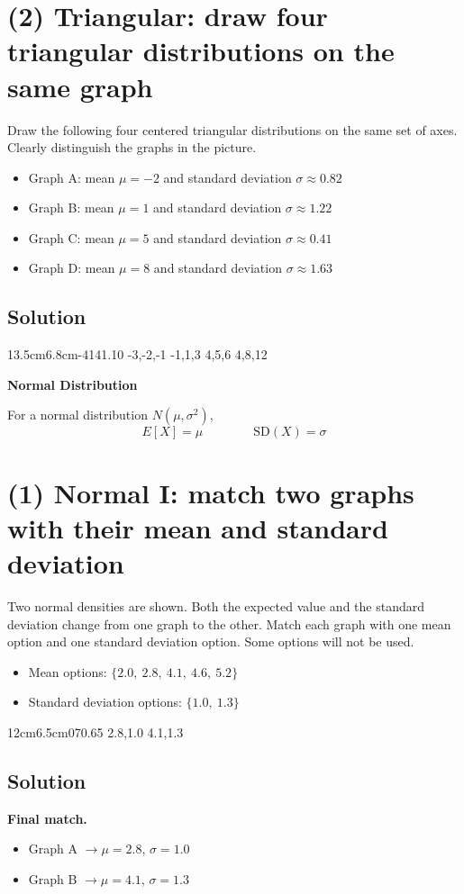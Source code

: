 \section{(2) Triangular: draw four triangular distributions on the same graph}
Draw the following four centered triangular distributions on the same set of axes. Clearly distinguish the graphs in the picture.
\begin{itemize}
\item Graph A: mean $\mu=-2$ and standard deviation $\sigma\approx0.82$
\item Graph B: mean $\mu=1$ and standard deviation $\sigma\approx1.22$
\item Graph C: mean $\mu=5$ and standard deviation $\sigma\approx0.41$
\item Graph D: mean $\mu=8$ and standard deviation $\sigma\approx1.63$
\end{itemize}
\subsection*{Solution}
\TriangularFourGraph
{13.5cm}{6.8cm}{-4}{14}{1.10}
{-3,-2,-1}
{-1,1,3}
{4,5,6}
{4,8,12}

\textbf{Normal Distribution}

For a normal distribution $N(\mu,\sigma^2)$,
\[
E[X]=\mu
\qquad \qquad
\mathrm{SD}(X)=\sigma
\]

\section{(1) Normal I: match two graphs with their mean and standard deviation}
Two normal densities are shown. Both the expected value and the standard deviation change from one graph to the other.
Match each graph with one mean option and one standard deviation option. Some options will not be used.
\begin{itemize}
\item Mean options: $\{2.0,\ 2.8,\ 4.1,\ 4.6,\ 5.2\}$
\item Standard deviation options: $\{1.0,\ 1.3\}$
\end{itemize}
\NormalTwoGraph
{12cm}{6.5cm}{0}{7}{0.65}
{2.8,1.0}
{4.1,1.3}

\subsection*{Solution}
\textbf{Final match.}
\begin{itemize}
\item Graph A $\to \mu=2.8$, $\sigma=1.0$
\item Graph B $\to \mu=4.1$, $\sigma=1.3$
\end{itemize}

